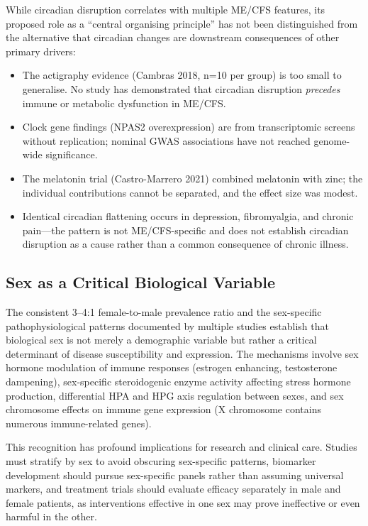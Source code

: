 \begin{limitation}
While circadian disruption correlates with multiple ME/CFS features, its proposed role as a ``central organising principle'' has not been distinguished from the alternative that circadian changes are downstream consequences of other primary drivers:
\begin{itemize}
    \item The actigraphy evidence (Cambras 2018, n=10 per group) is too small to generalise. No study has demonstrated that circadian disruption \emph{precedes} immune or metabolic dysfunction in ME/CFS.
    \item Clock gene findings (NPAS2 overexpression) are from transcriptomic screens without replication; nominal GWAS associations have not reached genome-wide significance.
    \item The melatonin trial (Castro-Marrero 2021) combined melatonin with zinc; the individual contributions cannot be separated, and the effect size was modest.
    \item Identical circadian flattening occurs in depression, fibromyalgia, and chronic pain---the pattern is not ME/CFS-specific and does not establish circadian disruption as a cause rather than a common consequence of chronic illness.
\end{itemize}
\end{limitation}

\subsection{Sex as a Critical Biological Variable}

The consistent 3--4:1 female-to-male prevalence ratio and the sex-specific pathophysiological patterns documented by multiple studies establish that biological sex is not merely a demographic variable but rather a critical determinant of disease susceptibility and expression. The mechanisms involve sex hormone modulation of immune responses (estrogen enhancing, testosterone dampening), sex-specific steroidogenic enzyme activity affecting stress hormone production, differential HPA and HPG axis regulation between sexes, and sex chromosome effects on immune gene expression (X chromosome contains numerous immune-related genes).

This recognition has profound implications for research and clinical care. Studies must stratify by sex to avoid obscuring sex-specific patterns, biomarker development should pursue sex-specific panels rather than assuming universal markers, and treatment trials should evaluate efficacy separately in male and female patients, as interventions effective in one sex may prove ineffective or even harmful in the other.

